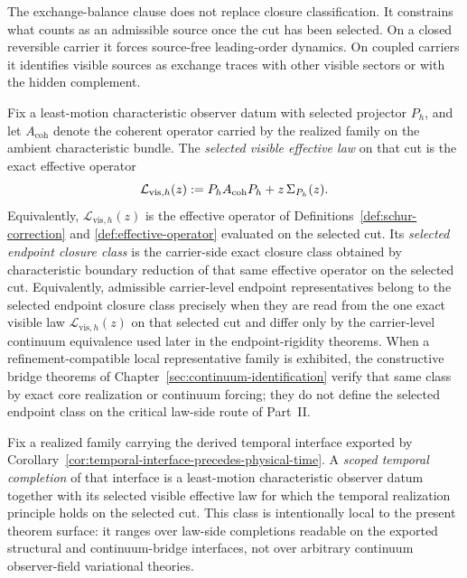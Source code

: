 The exchange-balance clause does not replace closure classification. It
constrains what counts as an admissible source once the cut has been selected.
On a closed reversible carrier it forces source-free leading-order dynamics.
On coupled carriers it identifies visible sources as exchange traces with
other visible sectors or with the hidden complement.

\begin{definition}
\label{def:selected-visible-effective-law}
Fix a least-motion characteristic observer datum with selected projector
\(P_h\), and let \(A_{\mathrm{coh}}\) denote the coherent operator carried by
the realized family on the ambient characteristic bundle. The
\emph{selected visible effective law} on that cut is the exact effective
operator
\[
\mathcal L_{\mathrm{vis},h}(z)
:=
P_hA_{\mathrm{coh}}P_h + z\,\Sigma_{P_h}(z).
\]
Equivalently, \(\mathcal L_{\mathrm{vis},h}(z)\) is the effective operator of
Definitions~\ref{def:schur-correction} and \ref{def:effective-operator}
evaluated on the selected cut. Its \emph{selected endpoint closure class} is the
carrier-side exact closure class obtained by characteristic boundary reduction
of that same effective operator on the selected cut. Equivalently, admissible
carrier-level endpoint representatives belong to the selected endpoint closure
class precisely when they are read from the one exact visible law
\(\mathcal L_{\mathrm{vis},h}(z)\) on that selected cut and differ only by the
carrier-level continuum equivalence used later in the endpoint-rigidity
theorems. When a refinement-compatible local representative family is
exhibited, the constructive bridge theorems of
Chapter~\ref{sec:continuum-identification} verify that same class by exact
core realization or continuum forcing; they do not define the selected
endpoint class on the critical law-side route of Part~II.
\end{definition}

\begin{definition}
\label{def:scoped-temporal-completion-class}
Fix a realized family carrying the derived temporal interface exported by
Corollary~\ref{cor:temporal-interface-precedes-physical-time}. A
\emph{scoped temporal completion} of that interface is a least-motion
characteristic observer datum together with its selected visible effective law
for which the temporal realization principle holds on the selected cut. This
class is intentionally local to the present theorem surface: it ranges over
law-side completions readable on the exported structural and continuum-bridge
interfaces, not
over arbitrary continuum observer-field variational theories.
\end{definition}

